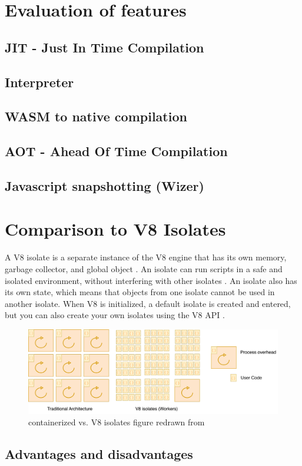 

\section{Evaluation of features}
\label{sec:evaluation-of-features}

\subsection{JIT - Just In Time Compilation}
\label{sec:jit}

\subsection{Interpreter}
\label{sec:interpreter}

\subsection{WASM to native compilation}
\label{sec:wasm-to-native}

\subsection{AOT - Ahead Of Time Compilation}
\label{sec:aot}


 \subsection{Javascript snapshotting (Wizer)}
\label{sec:wizer}

\section{Comparison to V8 Isolates}
\label{sec:v8-comparison}
A V8 isolate is a separate instance of the V8 engine that has its own memory, garbage collector, and global object \cite{a2021_isolate}. An isolate can run scripts in a safe and isolated environment, without interfering with other isolates \cite{cloudflareinc_2023_how}. An isolate also has its own state, which means that objects from one isolate cannot be used in another isolate. When V8 is initialized, a default isolate is created and entered, but you can also create your own isolates using the V8 API \cite{a2021_isolate}.

\begin{figure}[htbp]
	\centering
		\includegraphics[width=\textwidth,height=\textheight,keepaspectratio]{images/runtimes/v8-isolates.pdf}
	\caption{containerized vs. \gls{V8} \glspl{isolate} figure redrawn from \cite{cloudflareinc_2023_how}}
	\label{fig:v8-isolates}
\end{figure}

\subsection{Advantages and disadvantages}
\label{sec:advantages-disadvantages}